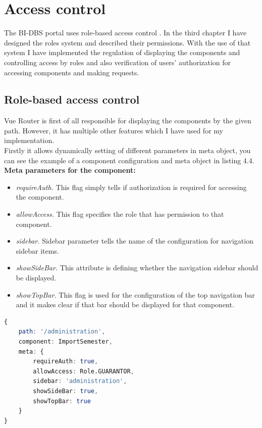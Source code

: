 \section{Access control} The BI-DBS portal uses role-based access control \cite{role-auth}. In the third chapter I have designed the roles system and described their permissions. With the use of that system I have implemented the regulation of displaying the components and controlling access by roles and also verification of users' authorization for accessing components and making requests.

\subsection{Role-based access control} Vue Router is first of all responsible for displaying the components by the given path. However, it has multiple other features which I have used for my implementation.\\
Firstly it allows dynamically setting of different parameters in meta object, you can see the example of a component configuration and meta object in listing 4.4.\\

\noindent \textbf{Meta parameters for the component:}

\begin{itemize}
    \item \emph{requireAuth.} This flag simply tells if authorization is required for accessing the component.
    \item \emph{allowAccess.} This flag specifies the role that has permission to that component.
    \item \emph{sidebar.} Sidebar parameter tells the name of the configuration for navigation sidebar items.
    \item \emph{showSideBar.} This attribute is defining whether the navigation sidebar should be displayed.
    \item \emph{showTopBar.} This flag is used for the configuration of the top navigation bar and it makes clear if that bar should be displayed for that component.
\end{itemize}

\begin{lstlisting}[language=Octave, caption=The example of component configuration in Router]
{
    path: '/administration',
    component: ImportSemester,
    meta: {
        requireAuth: true,
        allowAccess: Role.GUARANTOR,
        sidebar: 'administration',
        showSideBar: true,
        showTopBar: true
    }
}
\end{lstlisting}

